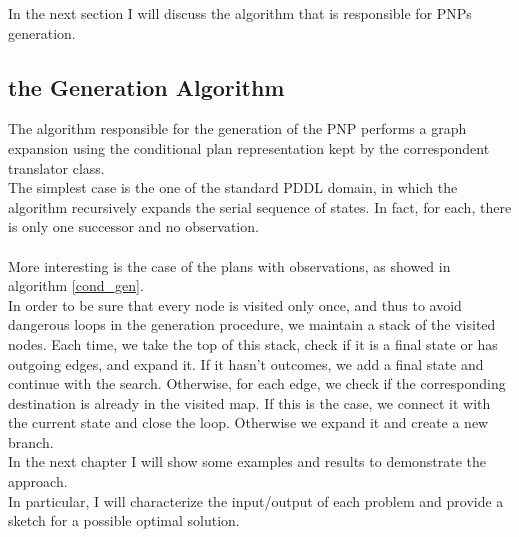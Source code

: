 \documentclass[pdftex,12pt,a4paper]{report}
\begin{document}
\noindent In the next section I will discuss the algorithm that is responsible for PNPs generation.
\subsection{the Generation Algorithm}
The algorithm responsible for the generation of the PNP performs a graph expansion using the conditional plan representation kept by the correspondent translator class.\\
The simplest case is the one of the standard PDDL domain, in which the algorithm recursively expands the serial sequence of states. In fact, for each, there is only one successor and no observation. \\

\\

\noindent More interesting is the case of the plans with observations, as showed in algorithm \ref{cond_gen}.\\
In order to be sure that every node is visited only once, and thus to avoid dangerous loops in the generation procedure, we maintain a stack of the visited nodes.
Each time, we take the top of this stack, check if it is a final state or has outgoing edges, and expand it.
If it hasn't outcomes, we add a final state and continue with the search. Otherwise, for each edge, we check if the corresponding destination is already in the visited map. If this is the case, we connect it with the current state and close the loop. Otherwise we expand it and create a new branch. \\

\noindent In the next chapter I will show some examples and results to demonstrate the approach. \\
In particular, I will characterize the input/output of each problem and provide a sketch for a possible optimal solution.
\end{document}
